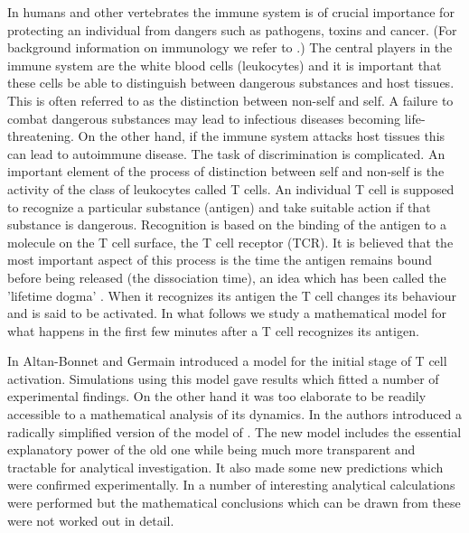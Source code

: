 \documentclass{article}
\begin{document}
In humans and other vertebrates the immune system is of crucial importance for
protecting an individual from dangers such as pathogens, toxins and cancer.
(For background information on immunology we refer to \cite{murphy12}.)
The central players in the immune system are the white blood cells (leukocytes)
and it is important that these cells be able to distinguish between dangerous
substances and host tissues. This is often referred to as the distinction 
between non-self and self. A failure to combat dangerous substances may lead 
to infectious diseases becoming life-threatening. On the other hand, if the 
immune system attacks host tissues this can lead to autoimmune disease. The 
task of discrimination is complicated. An important element of the process of 
distinction between self and non-self is the activity of the class of leukocytes
called T cells. An individual T cell is supposed to recognize a particular
substance (antigen) and take suitable action if that substance is dangerous.
Recognition is based on the binding of the antigen to a molecule on the T cell
surface, the T cell receptor (TCR). It is believed that the most important 
aspect of this process is the time the antigen remains bound before being 
released (the dissociation time), an idea which has been called the 'lifetime 
dogma' \cite{feinerman08a}. When it recognizes its antigen the T cell changes 
its behaviour and is said to be activated. In what follows we study a 
mathematical model for what happens in the first few minutes after a T cell 
recognizes its antigen. 

In \cite{altanbonnet05} Altan-Bonnet and Germain introduced a model for the 
initial stage of T cell activation. Simulations using this model gave results
which fitted a number of experimental findings. On the other hand it was too 
elaborate to be readily accessible to a mathematical analysis of its dynamics. 
In \cite{francois13} the authors introduced a radically simplified version of 
the model of \cite{altanbonnet05}. The new model includes the essential 
explanatory power of the old one while being much more transparent and 
tractable for analytical investigation. It also made some new predictions 
which were confirmed experimentally. In \cite{francois13} a number of
interesting analytical calculations were performed but the 
mathematical conclusions which can be drawn from these were not worked out
in detail.
\end{document}
